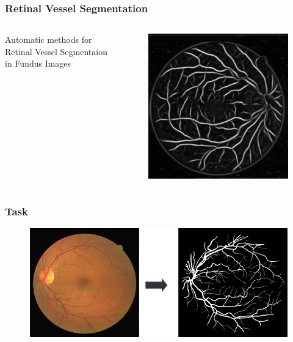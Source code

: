 \documentclass{beamer}
\begin{document}
		\begin{frame}
			\frametitle{Retinal Vessel Segmentation}
			
			\begin{columns}[c] %
				
				
				Automatic methods for Retinal Vessel Segmentaion in Fundus Images
				
				\begin{figure}
					\includegraphics[width=0.6\linewidth]{Images/slide1.png}
				\end{figure}
				
			\end{columns}
		\end{frame}
	
	\begin{frame}
		\frametitle{Task}
		\begin{figure}
			\includegraphics[width=1.0\linewidth]{Images/Graphic1.png}
		\end{figure}
	\end{frame}
	
\end{document}
